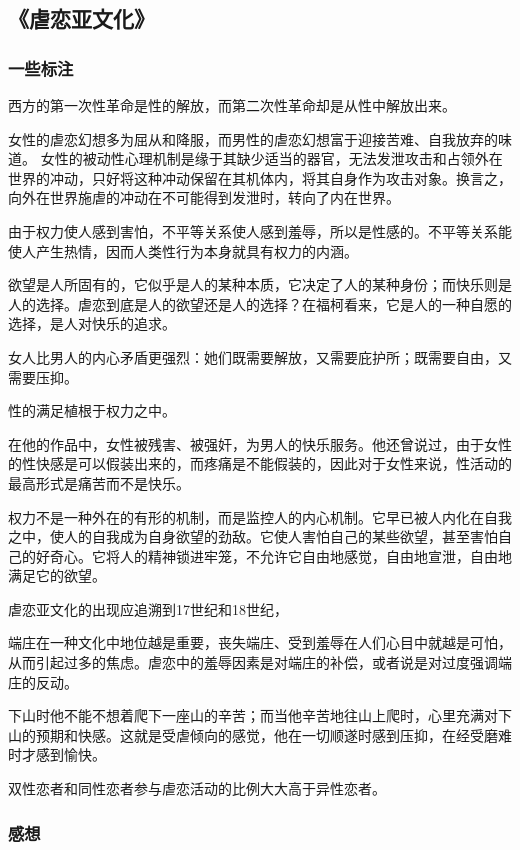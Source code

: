 \subsection{《虐恋亚文化》}
\subsubsection{一些标注}

西方的第一次性革命是性的解放，而第二次性革命却是从性中解放出来。

女性的虐恋幻想多为屈从和降服，而男性的虐恋幻想富于迎接苦难、自我放弃的味道。
女性的被动性心理机制是缘于其缺少适当的器官，无法发泄攻击和占领外在世界的冲动，只好将这种冲动保留在其机体内，将其自身作为攻击对象。换言之，向外在世界施虐的冲动在不可能得到发泄时，转向了内在世界。

由于权力使人感到害怕，不平等关系使人感到羞辱，所以是性感的。不平等关系能使人产生热情，因而人类性行为本身就具有权力的内涵。

欲望是人所固有的，它似乎是人的某种本质，它决定了人的某种身份；而快乐则是人的选择。虐恋到底是人的欲望还是人的选择？在福柯看来，它是人的一种自愿的选择，是人对快乐的追求。

女人比男人的内心矛盾更强烈：她们既需要解放，又需要庇护所；既需要自由，又需要压抑。

性的满足植根于权力之中。

在他的作品中，女性被残害、被强奸，为男人的快乐服务。他还曾说过，由于女性的性快感是可以假装出来的，而疼痛是不能假装的，因此对于女性来说，性活动的最高形式是痛苦而不是快乐。

权力不是一种外在的有形的机制，而是监控人的内心机制。它早已被人内化在自我之中，使人的自我成为自身欲望的劲敌。它使人害怕自己的某些欲望，甚至害怕自己的好奇心。它将人的精神锁进牢笼，不允许它自由地感觉，自由地宣泄，自由地满足它的欲望。

虐恋亚文化的出现应追溯到17世纪和18世纪，

端庄在一种文化中地位越是重要，丧失端庄、受到羞辱在人们心目中就越是可怕，从而引起过多的焦虑。虐恋中的羞辱因素是对端庄的补偿，或者说是对过度强调端庄的反动。

下山时他不能不想着爬下一座山的辛苦；而当他辛苦地往山上爬时，心里充满对下山的预期和快感。这就是受虐倾向的感觉，他在一切顺遂时感到压抑，在经受磨难时才感到愉快。

双性恋者和同性恋者参与虐恋活动的比例大大高于异性恋者。

\subsubsection{感想}

